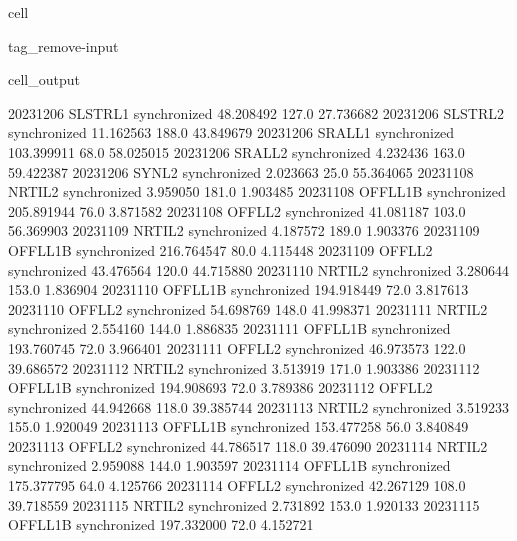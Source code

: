 \documentclass[letterpaper,10pt,english]{jupyterBook}
\begin{document}
\begin{sphinxuseclass}{cell}
\begin{sphinxuseclass}{tag_remove-input}
\begin{sphinxVerbatimOutput}
\begin{sphinxuseclass}{cell_output}
\begin{sphinxVerbatim}[commandchars=\\\{\}]
2023\PYGZhy{}12\PYGZhy{}06     SLSTR\PYGZus{}L1  synchronized   48.208492   127.0   27.736682
2023\PYGZhy{}12\PYGZhy{}06     SLSTR\PYGZus{}L2  synchronized   11.162563   188.0   43.849679
2023\PYGZhy{}12\PYGZhy{}06      SRAL\PYGZus{}L1  synchronized  103.399911    68.0   58.025015
2023\PYGZhy{}12\PYGZhy{}06      SRAL\PYGZus{}L2  synchronized    4.232436   163.0   59.422387
2023\PYGZhy{}12\PYGZhy{}06       SYN\PYGZus{}L2  synchronized    2.023663    25.0   55.364065
2023\PYGZhy{}11\PYGZhy{}08      NRTI\PYGZus{}L2  synchronized    3.959050   181.0    1.903485
2023\PYGZhy{}11\PYGZhy{}08     OFFL\PYGZus{}L1B  synchronized  205.891944    76.0    3.871582
2023\PYGZhy{}11\PYGZhy{}08      OFFL\PYGZus{}L2  synchronized   41.081187   103.0   56.369903
2023\PYGZhy{}11\PYGZhy{}09      NRTI\PYGZus{}L2  synchronized    4.187572   189.0    1.903376
2023\PYGZhy{}11\PYGZhy{}09     OFFL\PYGZus{}L1B  synchronized  216.764547    80.0    4.115448
2023\PYGZhy{}11\PYGZhy{}09      OFFL\PYGZus{}L2  synchronized   43.476564   120.0   44.715880
2023\PYGZhy{}11\PYGZhy{}10      NRTI\PYGZus{}L2  synchronized    3.280644   153.0    1.836904
2023\PYGZhy{}11\PYGZhy{}10     OFFL\PYGZus{}L1B  synchronized  194.918449    72.0    3.817613
2023\PYGZhy{}11\PYGZhy{}10      OFFL\PYGZus{}L2  synchronized   54.698769   148.0   41.998371
2023\PYGZhy{}11\PYGZhy{}11      NRTI\PYGZus{}L2  synchronized    2.554160   144.0    1.886835
2023\PYGZhy{}11\PYGZhy{}11     OFFL\PYGZus{}L1B  synchronized  193.760745    72.0    3.966401
2023\PYGZhy{}11\PYGZhy{}11      OFFL\PYGZus{}L2  synchronized   46.973573   122.0   39.686572
2023\PYGZhy{}11\PYGZhy{}12      NRTI\PYGZus{}L2  synchronized    3.513919   171.0    1.903386
2023\PYGZhy{}11\PYGZhy{}12     OFFL\PYGZus{}L1B  synchronized  194.908693    72.0    3.789386
2023\PYGZhy{}11\PYGZhy{}12      OFFL\PYGZus{}L2  synchronized   44.942668   118.0   39.385744
2023\PYGZhy{}11\PYGZhy{}13      NRTI\PYGZus{}L2  synchronized    3.519233   155.0    1.920049
2023\PYGZhy{}11\PYGZhy{}13     OFFL\PYGZus{}L1B  synchronized  153.477258    56.0    3.840849
2023\PYGZhy{}11\PYGZhy{}13      OFFL\PYGZus{}L2  synchronized   44.786517   118.0   39.476090
2023\PYGZhy{}11\PYGZhy{}14      NRTI\PYGZus{}L2  synchronized    2.959088   144.0    1.903597
2023\PYGZhy{}11\PYGZhy{}14     OFFL\PYGZus{}L1B  synchronized  175.377795    64.0    4.125766
2023\PYGZhy{}11\PYGZhy{}14      OFFL\PYGZus{}L2  synchronized   42.267129   108.0   39.718559
2023\PYGZhy{}11\PYGZhy{}15      NRTI\PYGZus{}L2  synchronized    2.731892   153.0    1.920133
2023\PYGZhy{}11\PYGZhy{}15     OFFL\PYGZus{}L1B  synchronized  197.332000    72.0    4.152721

\end{sphinxVerbatim}
\end{sphinxuseclass}
\end{sphinxVerbatimOutput}
\end{sphinxuseclass}
\end{sphinxuseclass}
\end{document}
